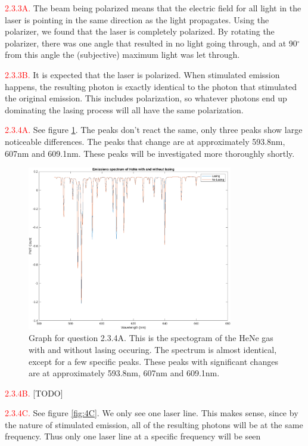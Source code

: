 \documentclass[letterpaper, reqno,11pt]{article}
\begin{document}
\noindent \textcolor{red}{2.3.3A.} The beam being polarized means that the electric field for all light in the laser is pointing in the same direction as the light propagates. Using the polarizer, we found that the laser is completely polarized. By rotating the polarizer, there was one angle that resulted in no light going through, and at 90$^{\circ}$ from this angle the (subjective) maximum light was let through.

\noindent \textcolor{red}{2.3.3B.} It is expected that the laser is polarized. When stimulated emission happens, the resulting photon is exactly identical to the photon that stimulated the original emission. This includes polarization, so whatever photons end up dominating the lasing process will all have the same polarization.

\noindent \textcolor{red}{2.3.4A.} See figure \ref{fig:4A}. The peaks don't react the same, only three peaks show large noticeable differences. The peaks that change are at approximately 593.8nm, 607nm and 609.1nm. These peaks will be investigated more thoroughly shortly.

\begin{figure}[htpb]
    \centering
    \includegraphics[width=0.8\textwidth]{4A}
    \caption{Graph for question 2.3.4A. This is the spectogram of the HeNe gas with and without lasing occuring. The spectrum is almost identical, except for a few specific peaks. These peaks with significant changes are at approximately 593.8nm, 607nm and 609.1nm.}
    \label{fig:4A}
\end{figure}

\noindent \textcolor{red}{2.3.4B.} [TODO]

\noindent \textcolor{red}{2.3.4C.} See figure \ref{fig:4C}. We only see one laser line. This makes sense, since by the nature of stimulated emission, all of the resulting photons will be at the same frequency. Thus only one laser line at a specific frequency will be seen
\end{document}
